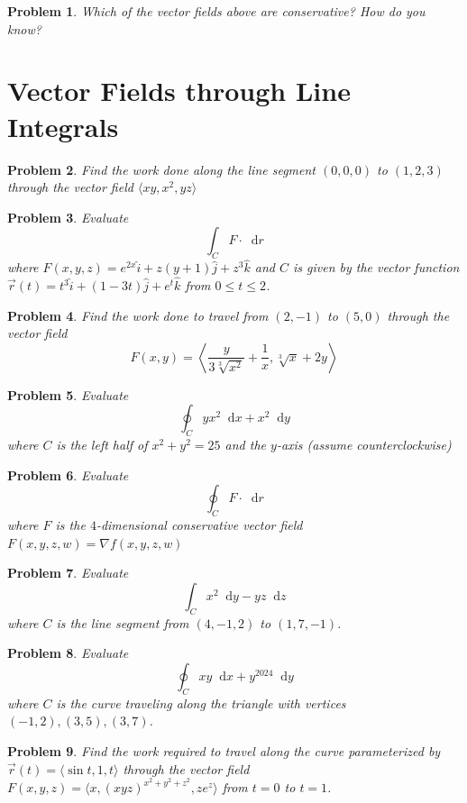 \documentclass[11pt]{article}
\newtheorem{problem}{Problem}
\newcommand*\dif{\mathop{}\!\mathrm{d}}
\begin{document}
\begin{problem}
    Which of the vector fields above are conservative? How do you know?
\end{problem}

\section{Vector Fields through Line Integrals}

\begin{problem}
  Find the work done along the line segment $(0,0,0)$ to $(1,2,3)$ through the vector field $\langle xy, x^2, yz \rangle$  
\end{problem}

\begin{problem}
    Evaluate \[\int_C F\cdot \dif{r}\] where $F(x,y,z) = e^{2x}\hat{i}+z(y+1)\hat{j}+z^3\hat{k}$ and $C$ is given by the vector function $\vec{r}(t) = t^3\hat{i}+(1-3t)\hat{j}+e^t\hat{k}$ from $0\leq t\leq 2$.
\end{problem}

\begin{problem}
    Find the work done to travel from $(2,-1)$ to $(5,0)$ through the vector field \[F(x,y) = \left\langle \frac{y}{3\sqrt[3]{x^2}}+\frac{1}{x}, \sqrt[3]{x}+2y \right\rangle\]
\end{problem}


\begin{problem}
Evaluate \[\oint_C yx^2 \dif{x} + x^2\dif{y}\] where $C$ is the left half of $x^2+y^2=25$ and the $y$-axis (assume counterclockwise)
\end{problem}


\begin{problem}
Evaluate \[\oint_C F \cdot \dif{r}\] where $F$ is the $4$-dimensional conservative vector field $F(x,y,z,w) = \nabla f(x,y,z,w)$
\end{problem}



\begin{problem}
Evaluate \[\int_C x^2 \dif{y} - yz \dif{z}\] where $C$ is the line segment from $(4,-1,2)$ to $(1,7,-1)$.
\end{problem}





\begin{problem}
Evaluate \[\oint_C xy \dif{x} + y^{2024} \dif{y}\] where $C$ is the curve traveling along the triangle with vertices $(-1,2), (3,5), (3,7)$.
\end{problem}

\begin{problem}
    Find the work required to travel along the curve parameterized by $\vec{r}(t) = \langle \sin{t}, 1, t \rangle$ through the vector field $F(x,y,z) = \langle x, (xyz)^{x^2+y^2+z^2}, ze^{z} \rangle$ from $t= 0$ to $t=1$.
\end{problem}
\end{document}
